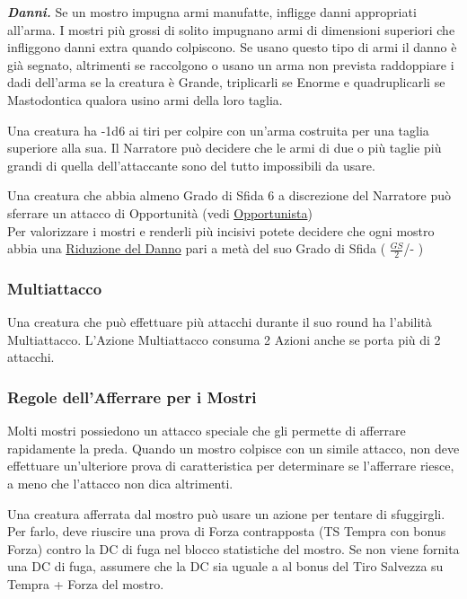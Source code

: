 \begin{multicols}{2}
	\textit{\textbf{Danni.}} Se un mostro impugna armi manufatte, infligge danni appropriati all'arma. I mostri più grossi di solito impugnano armi di dimensioni superiori che infliggono danni extra quando colpiscono. Se usano questo tipo di armi il danno è già segnato, altrimenti se raccolgono o usano un arma non prevista raddoppiare i dadi dell'arma se la creatura è Grande, triplicarli se Enorme e quadruplicarli se Mastodontica qualora usino armi della loro taglia.

	Una creatura ha -1d6 ai tiri per colpire con un'arma costruita per una taglia superiore alla sua. Il Narratore può decidere che le armi di due o più taglie più grandi di quella dell'attaccante sono del tutto impossibili da usare.

	\begin{changemargin}{0.3cm}{0.3cm}\begin{narratore}
			Una creatura che abbia almeno Grado di Sfida 6 a discrezione del Narratore può sferrare un attacco di Opportunità (vedi \hyperlink{opportunista}{Opportunista})\\

			Per valorizzare i mostri e renderli più incisivi potete decidere che ogni mostro abbia una  \hyperlink{riduzionedeldanno}{Riduzione del Danno} pari a metà del suo Grado di Sfida ( $\frac{GS}{2}$/- )

	\end{narratore}\end{changemargin}

	\subsubsection{Multiattacco}

	Una creatura che può effettuare più attacchi durante il suo round ha l'abilità Multiattacco. L'Azione Multiattacco consuma 2 Azioni anche se porta più di 2 attacchi.

	\subsubsection{Regole dell'Afferrare per i Mostri}

	Molti mostri possiedono un attacco speciale che gli permette di afferrare rapidamente la preda. Quando un mostro colpisce con un simile attacco, non deve effettuare un'ulteriore prova di caratteristica per determinare se l'afferrare riesce, a meno che l'attacco non dica altrimenti.

	Una creatura afferrata dal mostro può usare un azione per tentare di sfuggirgli. Per farlo, deve riuscire una prova di Forza contrapposta (TS Tempra con bonus Forza) contro la DC di fuga nel blocco statistiche del mostro. Se non viene fornita una DC di fuga, assumere che la DC sia uguale a al bonus del Tiro Salvezza su Tempra + Forza del mostro.


\end{multicols}
